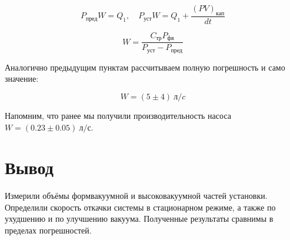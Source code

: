 \documentclass[a4paper, 12pt]{article}
\begin{document}
		    $$P_{пред}W = Q_1, \quad P_{уст}W = Q_1 + \frac{(PV)_{кап}}{dt}$$

            $$W = \frac{C_{тр} P_{фв}}{P_{уст} - P_{пред}}$$

            Аналогично предыдущим пунктам рассчитываем полную погрешность и само значение:

            $$W = (5 \pm 4)~л/c$$

            Напомним, что ранее мы получили производительность насоса $W = (0.23 \pm 0.05)~л/с$.

    \section{Вывод}

        Измерили объёмы формвакуумной и высоковакуумной частей установки. Определили скорость откачки системы в стационарном режиме, а также по ухудшению и по улучшению вакуума. Полученные результаты сравнимы в пределах погрешностей.
\end{document}
